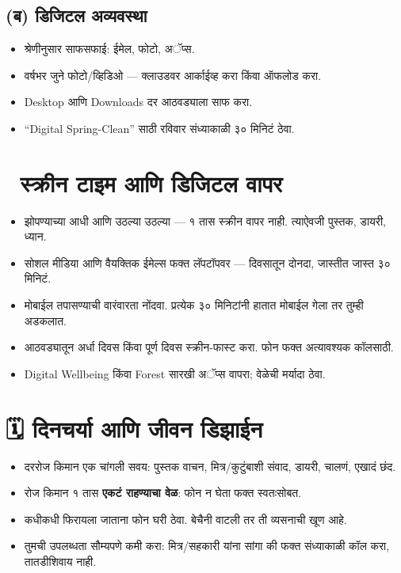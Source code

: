 \subsection*{(ब) डिजिटल अव्यवस्था}
\begin{itemize}
  \item श्रेणीनुसार साफसफाई: ईमेल, फोटो, अॅप्स.  
  \item वर्षभर जुने फोटो/व्हिडिओ — क्लाउडवर आर्काईव्ह करा किंवा ऑफलोड करा.  
  \item Desktop आणि Downloads दर आठवड्याला साफ करा.  
  \item “Digital Spring-Clean” साठी रविवार संध्याकाळी ३० मिनिटं ठेवा.  
\end{itemize}

\section*{📵 स्क्रीन टाइम आणि डिजिटल वापर}

\begin{itemize}
  \item झोपण्याच्या आधी आणि उठल्या उठल्या — १ तास स्क्रीन वापर नाही. त्याऐवजी पुस्तक, डायरी, ध्यान.  
  \item सोशल मीडिया आणि वैयक्तिक ईमेल्स फक्त लॅपटॉपवर — दिवसातून दोनदा, जास्तीत जास्त ३० मिनिटं.  
  \item मोबाईल तपासण्याची वारंवारता नोंदवा. प्रत्येक ३० मिनिटांनी हातात मोबाईल गेला तर तुम्ही अडकलात.  
  \item आठवड्यातून अर्धा दिवस किंवा पूर्ण दिवस स्क्रीन-फास्ट करा. फोन फक्त अत्यावश्यक कॉलसाठी.  
  \item Digital Wellbeing किंवा Forest सारखी अॅप्स वापरा; वेळेची मर्यादा ठेवा.  
\end{itemize}

\section*{🗓️ दिनचर्या आणि जीवन डिझाईन}

\begin{itemize}
  \item दररोज किमान एक चांगली सवय: पुस्तक वाचन, मित्र/कुटुंबाशी संवाद, डायरी, चालणं, एखादं छंद.  
  \item रोज किमान १ तास \textbf{एकटं राहण्याचा वेळ}: फोन न घेता फक्त स्वतःसोबत.  
  \item कधीकधी फिरायला जाताना फोन घरी ठेवा. बेचैनी वाटली तर ती व्यसनाची खूण आहे.  
  \item तुमची उपलब्धता सौम्यपणे कमी करा: मित्र/सहकारी यांना सांगा की फक्त संध्याकाळी कॉल करा, तातडीशिवाय नाही.  
\end{itemize}

